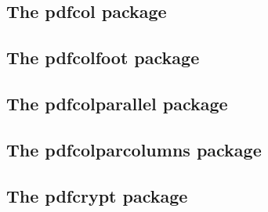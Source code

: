 \documentclass[a4paper,12pt]{article}
\makeatletter
\providecommand*{\pdfTeX}{pdf\TeX}
\providecommand*{\VTeX}{V\TeX}
\newcommand*{\xpackage}[1]{\textsf{#1}}
\newcommand*{\xfile}[1]{\texttt{#1}}
\newcommand*{\tocinclude}[1]{%
  \setcounter{tocdepth}{3}%
  \begingroup
    \makeatletter
    \def\@prj{#1}%
    \let\contentsline\foreign@contentsline
  \endgroup
}
\def\foreign@contentsline#1#2#3#4{%
  \ifx\\#4\\%
    \csname l@#1\endcsname{#2}{#3}%
  \else
    \ifHy@linktocpage
      \csname l@#1\endcsname{{#2}}{%
        \hyper@linkfile{#3}{\@prj.pdf}{#4}%
      }%
    \else
      \csname l@#1\endcsname{%
        \hyper@linkfile{#2}{\@prj.pdf}{#4}%
      }{#3}%
    \fi
  \fi
}%
\newcommand*{\pkgsectformat}[1]{%
  \texorpdfstring{%
    \textcolor{link}{The} %
    \xpackage{#1} %
    \textcolor{link}{package}%
  }{#1}%
}
\makeatother
\begin{document}
\newpage
\subsection{\pkgsectformat{pdfcol}}
\label{pdfcol}
\begin{abstract}
Since version 1.40 \pdfTeX\ supports color stacks.
The driver file \xfile{pdftex.def} for package \xpackage{color}
defines and uses a main color stack since version v0.04b.
Package \xpackage{pdfcol} is intended for package writers.
It defines macros for setting and maintaining new color stacks.
\end{abstract}
\tocinclude{pdfcol}

\newpage
\subsection{\pkgsectformat{pdfcolfoot}}
\label{pdfcolfoot}
\begin{abstract}
Since version 1.40 \pdfTeX\ supports several color stacks. This
package uses a separate color stack for footnotes that can break
across pages.
\end{abstract}
\tocinclude{pdfcolfoot}

\newpage
\subsection{\pkgsectformat{pdfcolparallel}}
\label{pdfcolparallel}
\begin{abstract}
This packages fixes bugs in \xpackage{parallel} and
improves color support by using several color stacks
that are provided by \pdfTeX\ since version 1.40.
\end{abstract}
\tocinclude{pdfcolparallel}

\newpage
\subsection{\pkgsectformat{pdfcolparcolumns}}
\label{pdfcolparcolumns}
\begin{abstract}
Since version 1.40 \pdfTeX\ supports several color stacks.
This package uses them to fix color problems in
package \xpackage{parcolumns}.
\end{abstract}
\tocinclude{pdfcolparcolumns}

\newpage
\subsection{\pkgsectformat{pdfcrypt}}
\label{pdfcrypt}
\begin{abstract}
This package supports the setting of pdf encryption options
for \VTeX\ and some older versions of \pdfTeX.
\end{abstract}
\tocinclude{pdfcrypt}
\end{document}
